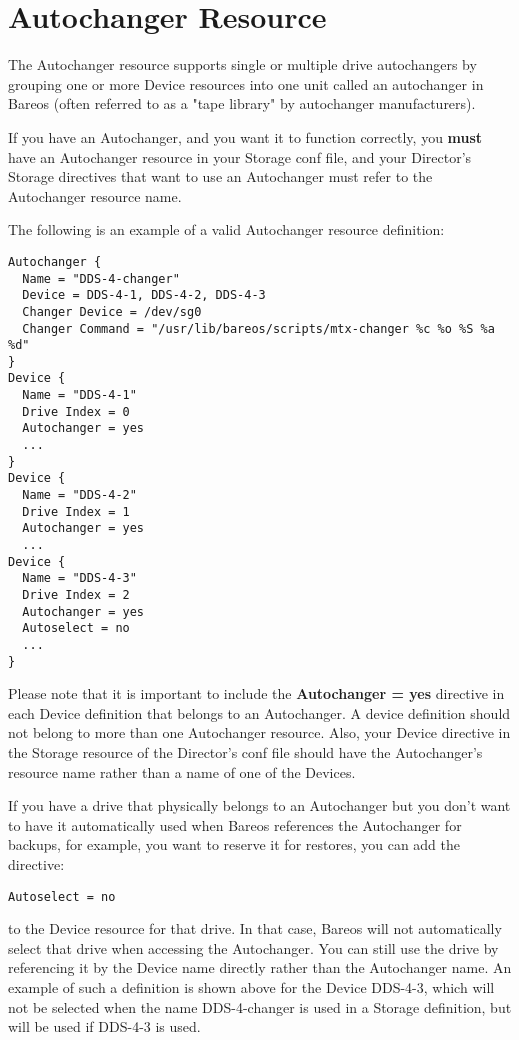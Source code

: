 \section{Autochanger Resource}
\label{AutochangerRes}
\label{AutochangerResource1}


The Autochanger resource supports single or multiple drive
autochangers by grouping one or more Device resources
into one unit called an autochanger in Bareos (often referred to
as a "tape library" by autochanger manufacturers).

If you have an Autochanger, and you want it to function correctly,
you {\bf must} have an Autochanger resource in your Storage
conf file, and your Director's Storage directives that want to
use an Autochanger must refer to the Autochanger resource name.





The following is an example of a valid Autochanger resource definition:

\footnotesize
\begin{verbatim}
Autochanger {
  Name = "DDS-4-changer"
  Device = DDS-4-1, DDS-4-2, DDS-4-3
  Changer Device = /dev/sg0
  Changer Command = "/usr/lib/bareos/scripts/mtx-changer %c %o %S %a %d"
}
Device {
  Name = "DDS-4-1"
  Drive Index = 0
  Autochanger = yes
  ...
}
Device {
  Name = "DDS-4-2"
  Drive Index = 1
  Autochanger = yes
  ...
Device {
  Name = "DDS-4-3"
  Drive Index = 2
  Autochanger = yes
  Autoselect = no
  ...
}
\end{verbatim}
\normalsize

Please note that it is important to include the {\bf Autochanger = yes} directive
in each Device definition that belongs to an Autochanger.  A device definition
should not belong to more than one Autochanger resource.  Also, your Device
directive in the Storage resource of the Director's conf file should have
the Autochanger's resource name rather than a name of one of the Devices.

If you have a drive that physically belongs to an Autochanger but you don't want
to have it automatically used when Bareos references the Autochanger for backups,
for example, you want to reserve it for restores, you can add the directive:

\footnotesize
\begin{verbatim}
Autoselect = no
\end{verbatim}
\normalsize

to the Device resource for that drive. In that case, Bareos will not automatically
select that drive when accessing the Autochanger. You can still use the drive
by referencing it by the Device name directly rather than the Autochanger name. An example
of such a definition is shown above for the Device DDS-4-3, which will not be
selected when the name DDS-4-changer is used in a Storage definition, but will
be used if DDS-4-3 is used.
